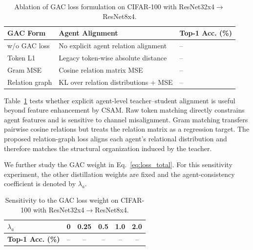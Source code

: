 \documentclass[a4paper,fleqn]{cas-dc}
\begin{document}
\begin{table}[pos=t]
\centering
\footnotesize
\caption{Ablation of GAC loss formulation on CIFAR-100 with ResNet32x4$\rightarrow$ResNet8x4.}
\label{tab:ablation_gac_form}
\setlength{\tabcolsep}{3.5pt}
\renewcommand{\arraystretch}{1.08}
\begin{tabular}{@{}>{\raggedright\arraybackslash}p{}>{\raggedright\arraybackslash}p{}>{\centering\arraybackslash}p{}@{}}
\toprule
\textbf{GAC Form} & \textbf{Agent Alignment} & \textbf{Top-1 Acc. (\%)} \\
\midrule
w/o GAC loss       & No explicit agent relation alignment       & -- \\
Token L1           & Legacy token-wise absolute distance        & -- \\
Gram MSE           & Cosine relation matrix MSE                 & -- \\
Relation graph     & KL over relation distributions + MSE       & -- \\
\bottomrule
\end{tabular}
\end{table}

Table~\ref{tab:ablation_gac_form} tests whether explicit agent-level
teacher--student alignment is useful beyond feature enhancement by CSAM. Raw
token matching directly constrains agent features and is sensitive to channel
misalignment. Gram matching transfers pairwise cosine relations but treats
the relation matrix as a regression target. The proposed relation-graph loss
aligns each agent's relational distribution and therefore matches the
structural organization induced by the teacher.

We further study the GAC weight in Eq.~\eqref{eq:loss_total}. For this
sensitivity experiment, the other distillation weights are fixed and the
agent-consistency coefficient is denoted by $\lambda_a$.

\begin{table}[pos=t]
\centering
\footnotesize
\caption{Sensitivity to the GAC loss weight on CIFAR-100 with ResNet32x4$\rightarrow$ResNet8x4.}
\label{tab:ablation_gac_weight}
\setlength{\tabcolsep}{4pt}
\renewcommand{\arraystretch}{1.08}
\begin{tabular*}{0.94\columnwidth}{@{\extracolsep{\fill}}lccccc}
\toprule
\textbf{$\lambda_a$} & 0 & 0.25 & 0.5 & 1.0 & 2.0 \\
\midrule
\textbf{Top-1 Acc. (\%)} & -- & -- & -- & -- & -- \\
\bottomrule
\end{tabular*}
\end{table}
\end{document}
